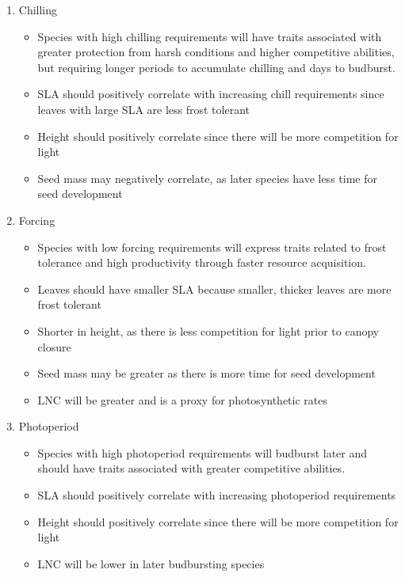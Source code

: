 \documentclass{article}\usepackage[]{graphicx}\usepackage[]{color}
\begin{document}
\begin{enumerate}
\item Chilling
\begin{itemize}
\item Species with high chilling requirements will have traits associated with greater protection from harsh conditions and higher competitive abilities, but requiring longer periods to accumulate chilling and days to budburst.
\item SLA should positively correlate with increasing chill requirements since leaves with large SLA are less frost tolerant 
\item Height should positively correlate since there will be more competition for light
\item Seed mass may negatively correlate, as later species have less time for seed development 
\end{itemize}

\item Forcing
\begin{itemize}
\item Species with low forcing requirements will express traits related to frost tolerance and high productivity through faster resource acquisition.
\item Leaves should have smaller SLA because smaller, thicker leaves are more frost tolerant
\item Shorter in height, as there is less competition for light prior to canopy closure
\item Seed mass may be greater as there is more time for seed development 
\item LNC will be greater and is a proxy for photosynthetic rates
\end{itemize}

\item Photoperiod
\begin{itemize}
\item Species with high photoperiod requirements will budburst later and should have traits associated with greater competitive abilities.
\item SLA should positively correlate with increasing photoperiod requirements 
\item Height should positively correlate since there will be more competition for light
\item LNC will be lower in later budbursting species  
\end{itemize}

\end{enumerate}
\end{document}

